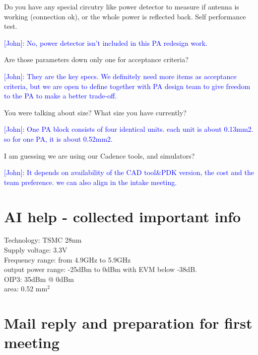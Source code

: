 \documentclass{article}
\begin{document}
Do you have any special circutry like power detector to measure if antenna is working (connection ok), or the whole power is reflected back. Self performance test.

\textcolor{blue}{[John]: No, power detector isn't included in this PA redesign work.  } 

Are those parameters down only one for acceptance criteria?

\textcolor{blue}{[John]: They are the key specs. We definitely need more items as acceptance criteria, but we are open to define together with PA design team to give freedom to the PA to make a better trade-off.  }

You were talking about size? What size you have currently?

\textcolor{blue}{[John]: One PA block consists of four identical units. each unit is about 0.13mm2. so for one PA, it is about 0.52mm2.   }

I am guessing we are using our Cadence tools, and simulators?

\textcolor{blue}{[John]: It depends on availability of the CAD tool\&PDK version, the cost and the team preference. we can also align in the intake meeting.} 


\section{AI help - collected important info}

Technology: TSMC 28nm \\
Supply voltage: 3.3V \\
Frequency range: from 4.9GHz to 5.9GHz \\
output power range: -25dBm to 0dBm with EVM below -38dB. \\
OIP3: 35dBm @ 0dBm \\ %
area: 0.52 mm$^2$

\section{Mail reply and preparation for first meeting}
\end{document}
